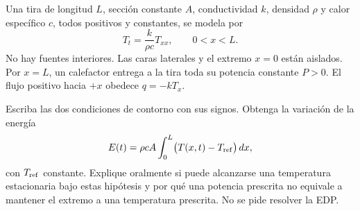 Una tira de longitud \(L\), sección constante \(A\), conductividad \(k\), densidad \(\rho\) y calor específico \(c\), todos positivos y constantes, se modela por
\[
T_t=\frac{k}{\rho c}T_{xx},\qquad 0<x<L.
\]
No hay fuentes interiores. Las caras laterales y el extremo \(x=0\) están aislados. Por \(x=L\), un calefactor entrega a la tira toda su potencia constante \(P>0\). El flujo positivo hacia \(+x\) obedece \(q=-kT_x\).

Escriba las dos condiciones de contorno con sus signos. Obtenga la variación de la energía
\[
E(t)=\rho c A\int_0^L\bigl(T(x,t)-T_{\rm ref}\bigr)\,dx,
\]
con \(T_{\rm ref}\) constante. Explique oralmente si puede alcanzarse una temperatura estacionaria bajo estas hipótesis y por qué una potencia prescrita no equivale a mantener el extremo a una temperatura prescrita. No se pide resolver la EDP.
